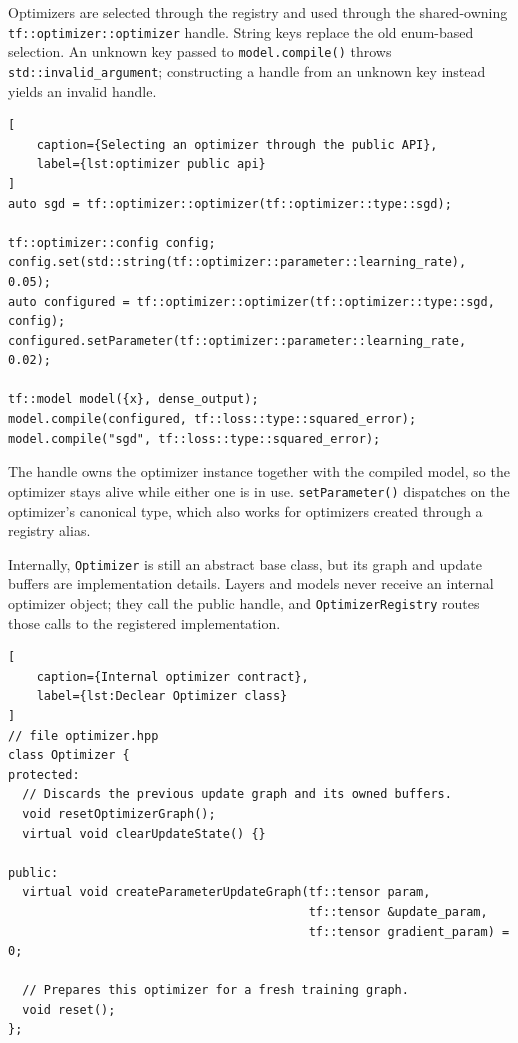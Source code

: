 Optimizers are selected through the registry and used through the
shared-owning \texttt{tf::optimizer::optimizer} handle. String keys replace the
old enum-based selection. An unknown key passed to \texttt{model.compile()}
throws \texttt{std::invalid\_argument}; constructing a handle from an unknown
key instead yields an invalid handle.

\begin{lstlisting}[
    caption={Selecting an optimizer through the public API},
    label={lst:optimizer public api}
]
auto sgd = tf::optimizer::optimizer(tf::optimizer::type::sgd);

tf::optimizer::config config;
config.set(std::string(tf::optimizer::parameter::learning_rate), 0.05);
auto configured = tf::optimizer::optimizer(tf::optimizer::type::sgd, config);
configured.setParameter(tf::optimizer::parameter::learning_rate, 0.02);

tf::model model({x}, dense_output);
model.compile(configured, tf::loss::type::squared_error);
model.compile("sgd", tf::loss::type::squared_error);
\end{lstlisting}

The handle owns the optimizer instance together with the compiled model, so the
optimizer stays alive while either one is in use. \texttt{setParameter()}
dispatches on the optimizer's canonical type, which also works for optimizers
created through a registry alias.

Internally, \texttt{Optimizer} is still an abstract base class, but its graph
and update buffers are implementation details. Layers and models never receive
an internal optimizer object; they call the public handle, and
\texttt{OptimizerRegistry} routes those calls to the registered implementation.

\begin{lstlisting}[
    caption={Internal optimizer contract},
    label={lst:Declear Optimizer class}
]
// file optimizer.hpp
class Optimizer {
protected:
  // Discards the previous update graph and its owned buffers.
  void resetOptimizerGraph();
  virtual void clearUpdateState() {}

public:
  virtual void createParameterUpdateGraph(tf::tensor param,
                                          tf::tensor &update_param,
                                          tf::tensor gradient_param) = 0;

  // Prepares this optimizer for a fresh training graph.
  void reset();
};
\end{lstlisting}

